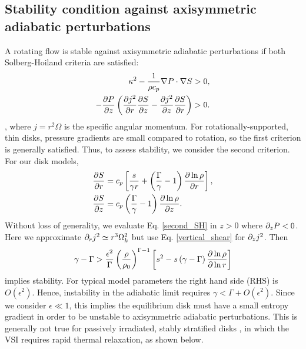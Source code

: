 \subsection{Stability condition against axisymmetric adiabatic
  perturbations}\label{solberg}
A rotating flow is stable against axisymmetric adiabatic perturbations
if both Solberg-Hoiland criteria  are satisfied:
\begin{align}
  \kappa^2 - \frac{1}{\rho c_p}\nabla P \cdot \nabla S &> 0,\\
  -\frac{\partial P}{\partial z}\left(\frac{\partial j^2}{\partial r}\frac{\partial S}{ \partial z} -
    \frac{\partial j^2}{\partial z}\frac{\partial S}{\partial r} \right)&>0. \label{second_SH} 
\end{align}
\citep{tassoul78}, where $j=r^2\Omega$ is the specific angular
momentum. For rotationally-supported, thin disks, pressure gradients are small 
compared to rotation, so the first criterion is generally
satisfied. Thus, to assess stability, we consider the second
criterion. For our disk models,
\begin{align}
  &\frac{\partial S}{\partial r} = c_p\left[\frac{s}{\gamma r} +
    \left(\frac{\Gamma}{\gamma}-1\right)\frac{\partial \ln{\rho}}{\partial
       r}\right],\\
  &\frac{\partial S}{\partial z} = c_p
  \left(\frac{\Gamma}{\gamma}-1\right)\frac{\partial \ln{\rho}}{\partial z}. 
\end{align} 
Without loss of generality, we evaluate Eq. \ref{second_SH} in $z>0$
where $\partial_zP<0$. Here we approximate $\partial_r j^2\simeq r^3\Omega_k^2$ but
use Eq. \ref{vertical_shear} for $\partial_zj^2$. Then 
\begin{align}\label{solberg2}
  \gamma - \Gamma > \frac{\epsilon^2}{\Gamma}
  \left(\frac{\rho}{\rho_0}\right)^{\Gamma-1} \left[s^2
    -s\left(\gamma-\Gamma\right)\frac{\partial\ln{\rho}}{\partial\ln{r}} \right]
\end{align} 
implies stability. For typical model parameters the right hand
side (RHS) is $O(\epsilon^2)$. Hence, instability in the adiabatic limit  
requires $\gamma < \Gamma + O(\epsilon^2)$. Since we consider
$\epsilon\ll1$, this implies the equilibrium disk must have a small
entropy gradient in order to be unstable to axisymmetric adiabatic
perturbations. This is generally not true for passively irradiated, stably
stratified disks \citep{chiang97}, in which the VSI requires rapid
thermal relaxation, as shown below. 

